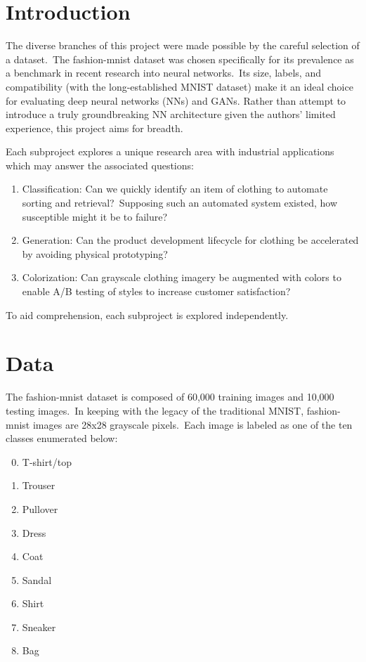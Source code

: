 \documentclass[conference]{IEEEtran}
\begin{document}
    \section{Introduction}\label{sec:introduction}

    The diverse branches of this project were made possible by the careful selection of a dataset.\ The fashion-mnist dataset was chosen specifically for its prevalence as a benchmark in recent research into neural networks.\ Its size, labels, and compatibility (with the long-established MNIST dataset) make it an ideal choice for evaluating deep neural networks (NNs) and GANs. Rather than attempt to introduce a truly groundbreaking NN architecture given the authors' limited experience, this project aims for breadth.

    Each subproject explores a unique research area with industrial applications which may answer the associated questions:

    \begin{enumerate}
        \item Classification: Can we quickly identify an item of clothing to automate sorting and retrieval?\ Supposing such an automated system existed, how susceptible might it be to failure?
        \item Generation: Can the product development lifecycle for clothing be accelerated by avoiding physical prototyping?
        \item Colorization: Can grayscale clothing imagery be augmented with colors to enable A/B testing of styles to increase customer satisfaction?
    \end{enumerate}

    To aid comprehension, each subproject is explored independently.

    \section{Data}\label{sec:data}

    The fashion-mnist dataset is composed of 60,000 training images and 10,000 testing images.\ In keeping with the legacy of the traditional MNIST, fashion-mnist images are 28x28 grayscale pixels.\ Each image is labeled as one of the ten classes enumerated below:

    \begin{enumerate}
        \setcounter{enumi}{-1}
        \item T-shirt/top
        \item Trouser
        \item Pullover
        \item Dress
        \item Coat
        \item Sandal
        \item Shirt
        \item Sneaker
        \item Bag
    \end{enumerate}
\end{document}
